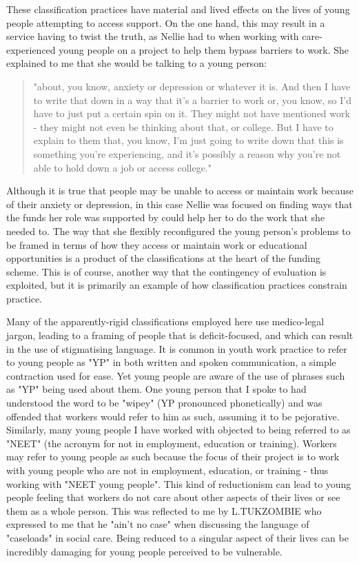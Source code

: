 These classification practices have material and lived effects on the lives of young people attempting to access support. On the one hand, this may result in a service having to twist the truth, as Nellie had to when working with care-experienced young people on a project to help them bypass barriers to work. She explained to me that she would be talking to a young person:
\begin{quote}
"about, you know, anxiety or depression or whatever it is. And then I have to write that down in a way that it's a barrier to work or, you know, so I'd have to just put a certain spin on it. They might not have mentioned work - they might not even be thinking about that, or college. But I have to explain to them that, you know, I'm just going to write down that this is something you're experiencing, and it's possibly a reason why you're not able to hold down a job or access college."
\end{quote}
Although it is true that people may be unable to access or maintain work because of their anxiety or depression, in this case Nellie was focused on finding ways that the funds her role was supported by could help her to do the work that she needed to. The way that she flexibly reconfigured the young person's problems to be framed in terms of how they access or maintain work or educational opportunities is a product of the classifications at the heart of the funding scheme. This is of course, another way that the contingency of evaluation is exploited, but it is primarily an example of how classification practices constrain practice.

Many of the apparently-rigid classifications employed here use medico-legal jargon, leading to a framing of people that is deficit-focused, and which can result in the use of stigmatising language. It is common in youth work practice to refer to young people as "YP" in both written and spoken communication, a simple contraction used for ease. Yet young people are aware of the use of phrases such as "YP" being used about them. One young person that I spoke to had understood the word to be "wipey" (YP pronounced phonetically) and was offended that workers would refer to him as such, assuming it to be pejorative. Similarly, many young people I have worked with objected to being referred to as "NEET" (the acronym for not in employment, education or training). Workers may refer to young people as such because the focus of their project is to work with young people who are not in employment, education, or training - thus working with "NEET young people". This kind of reductionism can lead to young people feeling that workers do not care about other aspects of their lives or see them as a whole person. This was reflected to me by L.TUKZOMBIE who expressed to me that he "ain't no case" when discussing the language of "caseloads" in social care. Being reduced to a singular aspect of their lives can be incredibly damaging for young people perceived to be vulnerable.  


